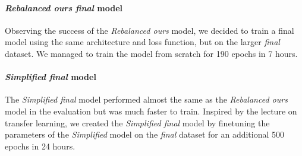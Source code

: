 \documentclass{article}
\begin{document}
\paragraph{\textit{Rebalanced ours final} model}
Observing the success of the \textit{Rebalanced ours} model, we decided to train a final model using the same architecture
and loss function, but on the larger \textit{final} dataset. We managed to train the model from scratch for 190 epochs in 7 hours.
\paragraph{\textit{Simplified final} model}
The \textit{Simplified final} model performed almost the same as the \textit{Rebalanced ours} model in the evaluation
but was much faster to train. Inspired by the lecture on transfer learning, we created the \textit{Simplified final} model
by finetuning the parameters of the \textit{Simplified} model on the \textit{final} dataset for an additional 500 epochs in 24 hours.
\end{document}
